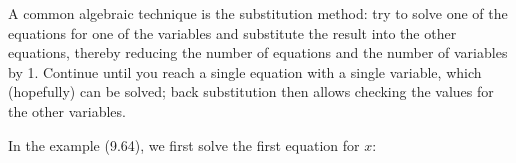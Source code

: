         
        \label{m39257*id159786}A common algebraic technique is the substitution method: try to solve one of the equations for one of the variables and substitute the result into the other equations, thereby reducing the number of equations and the number of variables by 1. Continue until you reach a single equation with a single variable, which (hopefully) can be solved; back substitution then allows checking the values for the other variables.\par 
        \label{m39257*id159793}In the example (9.64), we first solve the first equation for \begin{math}x\end{math}:\par 
        \label{m39257*id159811}\nopagebreak\noindent{}
    
